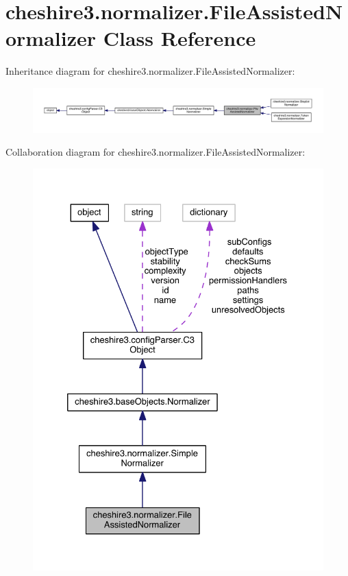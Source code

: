 \hypertarget{classcheshire3_1_1normalizer_1_1_file_assisted_normalizer}{\section{cheshire3.\-normalizer.\-File\-Assisted\-Normalizer Class Reference}
\label{classcheshire3_1_1normalizer_1_1_file_assisted_normalizer}
}


Inheritance diagram for cheshire3.\-normalizer.\-File\-Assisted\-Normalizer\-:
\nopagebreak
\begin{figure}[H]
\begin{center}
\leavevmode
\includegraphics[width=350pt]{classcheshire3_1_1normalizer_1_1_file_assisted_normalizer__inherit__graph}
\end{center}
\end{figure}


Collaboration diagram for cheshire3.\-normalizer.\-File\-Assisted\-Normalizer\-:
\nopagebreak
\begin{figure}[H]
\begin{center}
\leavevmode
\includegraphics[width=328pt]{classcheshire3_1_1normalizer_1_1_file_assisted_normalizer__coll__graph}
\end{center}
\end{figure}
